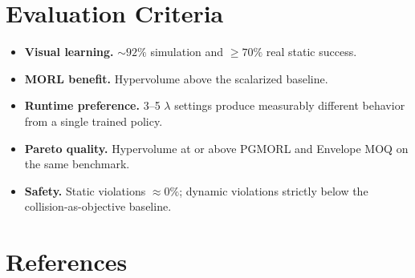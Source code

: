 \documentclass[11pt,a4paper]{article}
\begin{document}
\section{Evaluation Criteria}

\begin{itemize}
  \item \textbf{Visual learning.} $\sim 92\%$ simulation and
  $\geq 70\%$ real static success.
  \item \textbf{MORL benefit.} Hypervolume above the scalarized baseline.
  \item \textbf{Runtime preference.} 3--5 $\lambda$ settings produce
  measurably different behavior from a single trained policy.
  \item \textbf{Pareto quality.} Hypervolume at or above PGMORL and
  Envelope MOQ on the same benchmark.
  \item \textbf{Safety.} Static violations $\approx 0\%$; dynamic
  violations strictly below the collision-as-objective baseline.
\end{itemize}

\section{References}
\end{document}
